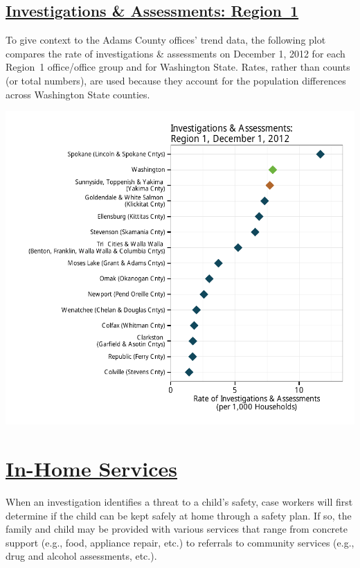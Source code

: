 \documentclass{article}\usepackage[]{graphicx}\usepackage[]{color}
\makeatletter
\def\maxwidth{ %
  \ifdim\Gin@nat@width>\linewidth
    \linewidth
  \else
    \Gin@nat@width
  \fi
}
\newenvironment{knitrout}{}{} %
\makeatother
\begin{document}
\subsection{
    \href{http://www.partnersforourchildren.org//child-well-being/visualizations/investigations-assessments/trends}
    {Investigations \& Assessments: Region~1}}
To give context to the Adams County offices' trend data, the following plot compares the rate of investigations \& assessments on December 1, 2012 for each Region~1 office/office group and for Washington State.  Rates, rather than counts (or total numbers), are used because they account for the population differences across Washington State counties.
\nopagebreak[3]
\begin{knitrout}
\color{fgcolor}

{\centering \includegraphics[width=\maxwidth]{figure/ia_context} 

}



\end{knitrout}



\newpage
\section{\href{http://www.partnersforourchildren.org/child-well-being/visualizations/home-services/trends}
    {In-Home Services}
}
When an investigation identifies a threat to a child's safety, case workers will first determine if the child can be kept safely at home through a safety plan. If so, the family and child may be provided with various services that range from concrete support (e.g., food, appliance repair, etc.) to referrals to community services (e.g., drug and alcohol assessments, etc.).\\[6pt]
\label{p:ihs}
\end{document}
